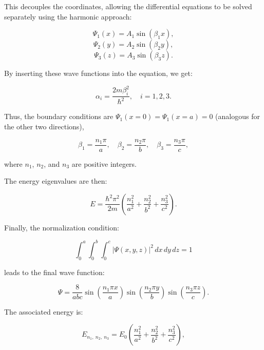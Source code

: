 \documentclass{article}
\begin{document}
This decouples the coordinates, allowing the differential equations to be solved separately using the harmonic approach:

\begin{equation*}
\Psi_1(x) = A_1 \sin(\beta_1 x), 
\end{equation*}
\begin{equation*}
\Psi_2(y) = A_2 \sin(\beta_2 y), 
\end{equation*}
\begin{equation*}
\Psi_3(z) = A_3 \sin(\beta_3 z). 
\end{equation*}

By inserting these wave functions into the equation, we get:

\begin{equation*}
	\alpha_i = \frac{2m \beta_i^2}{\hbar^2}, \quad i = 1, 2, 3.
\end{equation*}
	

Thus, the boundary conditions are $\Psi_1(x = 0) = \Psi_1(x = a) = 0$ (analogous for the other two directions),

\begin{equation*}
\beta_1 = \frac{n_1 \pi}{a}, \quad \beta_2 = \frac{n_2 \pi}{b}, \quad \beta_3 = \frac{n_3 \pi}{c}, 
\end{equation*}

where $n_1$, $n_2$, and $n_3$ are positive integers.

The energy eigenvalues are then:

\begin{equation*}
E = \frac{\hbar^2 \pi^2}{2m} \left( \frac{n_1^2}{a^2} + \frac{n_2^2}{b^2} + \frac{n_3^2}{c^2} \right). 
\end{equation*}

Finally, the normalization condition:

\begin{equation*}
\int_0^a \int_0^b \int_0^c |\Psi(x, y, z)|^2 \, dx \, dy \, dz = 1 
\end{equation*}

leads to the final wave function:

\begin{equation*}
\Psi = \frac{8}{abc} \sin \left( \frac{n_1 \pi x}{a} \right) \sin \left( \frac{n_2 \pi y}{b} \right) \sin \left( \frac{n_3 \pi z}{c} \right). 
\end{equation*}

The associated energy is:

\begin{equation*}
	E_{n_1, \ n_2, \ n_3} = E_0 \left( \frac{n_1^2}{a^2} + \frac{n_2^2}{b^2} + \frac{n_3^2}{c^2} \right),
\end{equation*}
\end{document}
